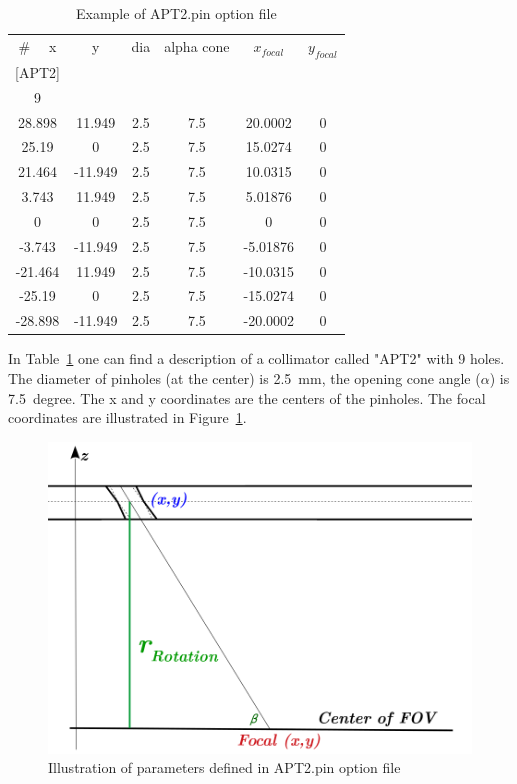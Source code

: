 \documentclass[12pt]{article}
\begin{document}
 \begin{table}[ht]
 \begin{center}
     \begin{tabular}{cccccc}
      \#~~ x & y & dia & alpha cone & $x_{focal}$ & $y_{focal}$ \\
	  {[APT2]} &  & &  &  &  \\
	   9 &  & &  &  &  \\
	   28.898 & 11.949 & 2.5 & 7.5 & 20.0002 & 0 \\
		25.19 & 0 & 2.5 & 7.5 & 15.0274 & 0 \\
		21.464 & -11.949 & 2.5 & 7.5 & 10.0315 & 0 \\
		3.743 & 11.949 & 2.5 & 7.5 & 5.01876 & 0 \\
		0     & 0 & 2.5 & 7.5 & 0 & 0 \\
		-3.743 & -11.949 & 2.5 & 7.5 & -5.01876 & 0 \\
		-21.464 & 11.949 & 2.5 & 7.5 & -10.0315 & 0 \\
		-25.19 & 0 & 2.5 & 7.5 & -15.0274 & 0 \\
		-28.898 & -11.949 & 2.5 & 7.5 & -20.0002 & 0 \\
     
     \end{tabular}
     \caption{Example of APT2.pin option file}
     \label{tab:ResTUBES}
  \end{center}
  \end{table}
In Table~\ref{tab:ResTUBES} one can find a description of a collimator called "APT2" with 9 holes. The diameter of pinholes (at the center) is 2.5~mm, the opening cone angle ($\alpha$) is 7.5~degree. The x and y coordinates are the centers of the pinholes. The focal coordinates are illustrated in Figure~\ref{fig:pinhole}.
\begin{figure}[htp]
\centering
\includegraphics[scale=0.4]{figs/pinhole_for_option_file.png}
\caption{Illustration of parameters defined in APT2.pin option file}
\label{fig:pinhole}
\end{figure}
\end{document}
